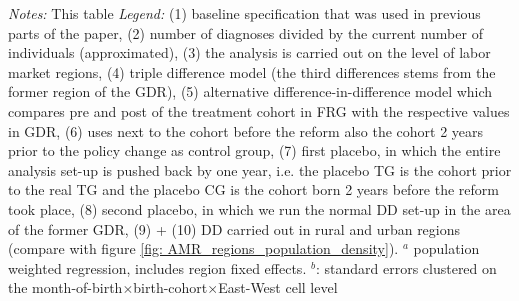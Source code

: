 \begin{landscape}
\begin{table}[htbp]
\begin{threeparttable}
{\begin{tabular}{l*{10}{c}}
					\bottomrule
			\end{tabular}}
	\end{threeparttable} 
		\begin{minipage}{0.87\linewidth}
		\scriptsize \emph{Notes:} This table %
		\newline \emph{Legend:} (1) baseline specification that was used in previous parts of the paper, (2) number of diagnoses divided by the current number of individuals (approximated), (3) the analysis is carried out on the level of labor market regions, (4) triple difference model (the third differences stems from the former region of the GDR), (5) alternative difference-in-difference model which compares pre and post of the treatment cohort in FRG with the respective values in GDR, (6) uses next to the cohort before the reform also the cohort 2 years prior to the policy change as control group, (7) first placebo, in which the entire analysis set-up is pushed back by one year, i.e. the placebo TG is the cohort prior to the real TG and the placebo CG is the cohort born 2 years before the reform took place, (8) second placebo, in which we run the normal DD set-up in the area of the former GDR, (9) + (10)  DD carried out in rural and urban regions (compare with figure \ref{fig: AMR_regions_population_density}). \newline
		\hspace{10 pt}$^a$ population weighted regression, includes region fixed effects.\newline
		\hspace{10 pt}$^b$: standard errors clustered on the month-of-birth$\times$birth-cohort$\times$East-West cell level
	\end{minipage}
\end{table} 
	\vspace*{\fill}\clearpage
\end{landscape}


